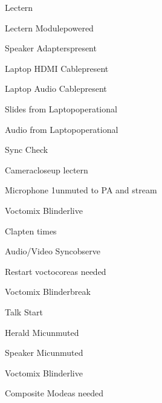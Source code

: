 \begin{checklist}{Lectern}
  \item{Lectern Module}{powered}
  \item{Speaker Adapters}{present}
  \item{Laptop HDMI Cable}{present}
  \item{Laptop Audio Cable}{present}
  \item{Slides from Laptop}{operational}
  \item{Audio from Laptop}{operational}
\end{checklist}


\begin{checklist}{Sync Check}
  \item{Camera}{closeup lectern}
  \item{Microphone 1}{unmuted to PA and stream}
  \item{Voctomix Blinder}{live}
  \item{Clap}{ten times}
  \item{Audio/Video Sync}{observe}
  \item{Restart voctocore}{as needed}
  \item{Voctomix Blinder}{break}

\end{checklist}


\begin{checklist}{Talk Start}
  \item{Herald Mic}{unmuted}
  \item{Speaker Mic}{unmuted}
  \item{Voctomix Blinder}{live}
  \item{Composite Mode}{as needed}
\end{checklist}


